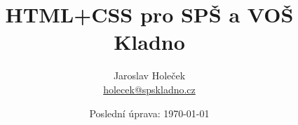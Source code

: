\documentclass[10pt,a4paper]{article}
\author{Jaroslav Holeček\\ \href{mailto:holecek@spskladno.cz}{holecek@spskladno.cz}}
\title{HTML+CSS pro SPŠ a VOŠ Kladno}
\date{Poslední úprava: \today}
\begin{document}
\doclicenseThis
\maketitle
\tableofcontents






\end{document}
